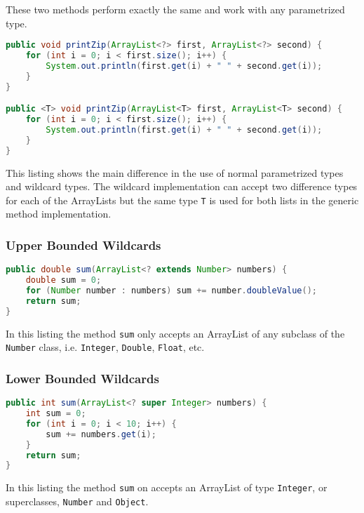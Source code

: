 \documentclass[12pt letter]{report}
\begin{document}
These two methods perform exactly the same and work with any parametrized type.

\begin{lstlisting}[language=Java]
public void printZip(ArrayList<?> first, ArrayList<?> second) {
    for (int i = 0; i < first.size(); i++) {
        System.out.println(first.get(i) + " " + second.get(i));
    }
}

public <T> void printZip(ArrayList<T> first, ArrayList<T> second) {
    for (int i = 0; i < first.size(); i++) {
        System.out.println(first.get(i) + " " + second.get(i));
    }
}
\end{lstlisting}

This listing shows the main difference in the use of normal parametrized types and wildcard types. The wildcard
implementation can accept two difference types for each of the ArrayLists but the same type \lstinline{T} is used for
both lists in the generic method implementation.

\subsubsection{Upper Bounded Wildcards}


\begin{lstlisting}[language=Java]
public double sum(ArrayList<? extends Number> numbers) {
    double sum = 0;
    for (Number number : numbers) sum += number.doubleValue();
    return sum;
}
\end{lstlisting}

In this listing the method \lstinline{sum} only accepts an ArrayList of any subclass of the \lstinline{Number} class, i.e.
\lstinline{Integer}, \lstinline{Double}, \lstinline{Float}, etc.

\subsubsection{Lower Bounded Wildcards}


\begin{lstlisting}[language=Java]
public int sum(ArrayList<? super Integer> numbers) {
    int sum = 0;
    for (int i = 0; i < 10; i++) {
        sum += numbers.get(i);
    }
    return sum;
}
\end{lstlisting}

In this listing the method \lstinline{sum} on accepts an ArrayList of type \lstinline{Integer}, or superclasses,
\lstinline{Number} and \lstinline{Object}.
\end{document}
